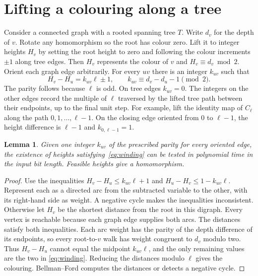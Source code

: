 \documentclass[11pt]{article}
\newtheorem{lemma}[theorem]{Lemma}
\begin{document}
\section{Lifting a colouring along a tree}
Consider a connected graph with a rooted spanning tree $T$. Write $d_v$
for the depth of $v$. Rotate any homomorphism so the root has colour
zero. Lift it to integer heights $H_v$ by setting the root height to
zero and following the colour increments $\pm1$ along tree edges. Then
$H_v$ represents the colour of $v$ and $H_v\equiv d_v\bmod 2$.
Orient each graph edge arbitrarily. For every $uv$ there is an integer
$k_{uv}$ such that
\begin{equation}\label{eq:winding}
       H_v-H_u=k_{uv}\ell\pm1,\qquad
       k_{uv}\equiv d_v-d_u-1\pmod 2 .
\end{equation}
The parity follows because $\ell$ is odd. On tree edges $k_{uv}=0$.
The integers on the other edges record the multiple of $\ell$ traversed
by the lifted tree path between their endpoints, up to the final unit step.
For example, lift the identity map of $C_\ell$ along the path
$0,1,\ldots,\ell-1$. On the closing edge oriented from $0$ to $\ell-1$,
the height difference is $\ell-1$ and $k_{0,\ell-1}=1$.

\begin{lemma}\label{lem:solve}
Given one integer $k_{uv}$ of the prescribed parity for every oriented
edge, the existence of heights satisfying~\eqref{eq:winding} can be
tested in polynomial time in the input bit length. Feasible heights give
a homomorphism.
\end{lemma}
\begin{proof}
Use the inequalities $H_v-H_u\leq k_{uv}\ell+1$ and
$H_u-H_v\leq 1-k_{uv}\ell$. Represent each as a directed arc from the
subtracted variable to the other, with its right-hand side as weight.
A negative cycle makes the inequalities inconsistent. Otherwise let
$H_v$ be the shortest distance from the root in this digraph. Every
vertex is reachable because each graph edge supplies both arcs.
The distances satisfy both inequalities. Each arc weight has the parity
of the depth difference of its endpoints, so every root-to-$v$ walk has
weight congruent to $d_v$ modulo two. Thus $H_v-H_u$ cannot equal the
midpoint $k_{uv}\ell$, and the only remaining values are the two in
\eqref{eq:winding}. Reducing the distances modulo $\ell$ gives the
colouring. Bellman--Ford computes the distances or detects a negative cycle.
\end{proof}
\end{document}
